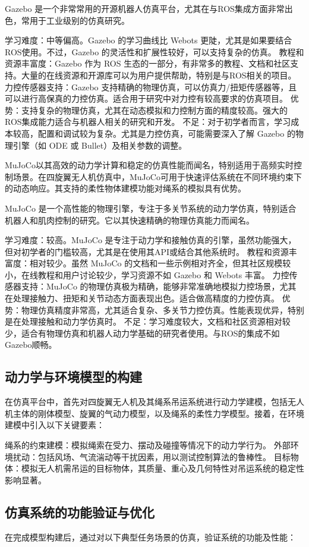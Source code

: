 \documentclass[lang=chs, degree=master, blindreview=false, winfonts=true]{yanputhesis}
\begin{document}
Gazebo 是一个非常常用的开源机器人仿真平台，尤其在与ROS集成方面非常出色，常用于工业级别的仿真研究。

学习难度：中等偏高。Gazebo 的学习曲线比 Webots 更陡，尤其是如果要结合ROS使用。不过，Gazebo 的灵活性和扩展性较好，可以支持复杂的仿真。
教程和资源丰富度：Gazebo 作为 ROS 生态的一部分，有非常多的教程、文档和社区支持。大量的在线资源和开源库可以为用户提供帮助，特别是与ROS相关的项目。
力控传感器支持：Gazebo 支持精确的物理仿真，可以仿真力/扭矩传感器等，且可以进行高保真的力控仿真。适合用于研究中对力控有较高要求的仿真项目。
优势：支持复杂的物理仿真，尤其在动态模拟和力控制方面的精度较高。强大的ROS集成能力适合与机器人相关的研究和开发。
不足：对于初学者而言，学习成本较高，配置和调试较为复杂。尤其是力控仿真，可能需要深入了解 Gazebo 的物理引擎（如 ODE 或 Bullet）及相关参数的调整。
	

MuJoCo以其高效的动力学计算和稳定的仿真性能而闻名，特别适用于高频实时控制场景。在四旋翼无人机仿真中，MuJoCo可用于快速评估系统在不同环境约束下的动态响应。其支持的柔性物体建模功能对绳系的模拟具有优势。

MuJoCo 是一个高性能的物理引擎，专注于多关节系统的动力学仿真，特别适合机器人和肌肉控制的研究。它以其快速精确的物理仿真能力而闻名。

学习难度：较高。MuJoCo 是专注于动力学和接触仿真的引擎，虽然功能强大，但对初学者的门槛较高，尤其是在使用其API或结合其他系统时。
教程和资源丰富度：相对较少。虽然 MuJoCo 的文档和一些示例相对齐全，但其社区规模较小，在线教程和用户讨论较少，学习资源不如 Gazebo 和 Webots 丰富。
力控传感器支持：MuJoCo 的物理仿真极为精确，能够非常准确地模拟力控场景，尤其在处理接触力、扭矩和关节动态方面表现出色。适合做高精度的力控仿真。
优势：物理仿真精度非常高，尤其适合复杂、多关节力控仿真。性能表现优异，特别是在处理接触和动力学仿真时。
不足：学习难度较大，文档和社区资源相对较少，适合有物理仿真和机器人动力学基础的研究者使用。与ROS的集成不如Gazebo顺畅。


\subsection{动力学与环境模型的构建}
在仿真平台中，首先对四旋翼无人机及其绳系吊运系统进行动力学建模，包括无人机主体的刚体模型、旋翼的气动力模型，以及绳系的柔性力学模型。接着，在环境建模中引入以下关键要素：

绳系的约束建模：模拟绳索在受力、摆动及碰撞等情况下的动力学行为。
外部环境扰动：包括风场、气流湍动等干扰因素，用以测试控制算法的鲁棒性。
目标物体：模拟无人机需吊运的目标物体，其质量、重心及几何特性对吊运系统的稳定性影响显著。
\subsection{仿真系统的功能验证与优化}
在完成模型构建后，通过对以下典型任务场景的仿真，验证系统的功能及性能：
\end{document}
